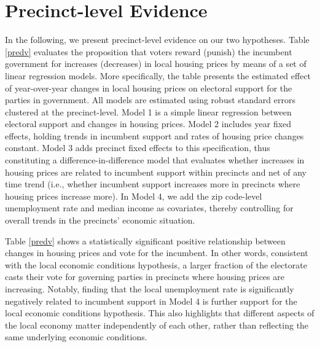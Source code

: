 \documentclass[12pt,a4paper]{article}
\begin{document}
	\section{Precinct-level Evidence} \label{inference}
	In the following, we present precinct-level evidence on our two hypotheses. Table \ref{predv}  evaluates the proposition that voters reward (punish) the incumbent government for increases (decreases) in local housing prices by means of a set of linear regression models. More specifically, the table presents the estimated effect of year-over-year changes in local housing prices on electoral support for the parties in government. All models are estimated using robust standard errors clustered at the precinct-level. Model 1 is a simple linear regression between electoral support and changes in housing prices. Model 2 includes year fixed effects, holding trends in incumbent support and rates of housing price changes constant. Model 3 adds precinct fixed effects to this specification, thus constituting a difference-in-difference model that evaluates whether increases in housing prices are related to incumbent support within precincts and net of any time trend (i.e., whether incumbent support increases more in precincts where housing prices increase more). In Model 4, we add the zip code-level unemployment rate and median income as covariates, thereby controlling for overall trends in the precincts’ economic situation. 
	
	
	
	Table \ref{predv} shows a statistically significant positive relationship between changes in housing prices and vote for the incumbent. In other words, consistent with the local economic conditions hypothesis, a larger fraction of the electorate casts their vote for governing parties in precincts where housing prices are increasing. 
	Notably, finding that the local unemployment rate is significantly negatively related to incumbent support in Model 4 is further support for the local economic conditions hypothesis. This also highlights that different aspects of the local economy matter independently of each other, rather than reflecting the same underlying economic conditions.
	
\end{document}
